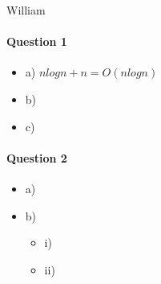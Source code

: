 William
\paragraph{Question 1}
\begin{itemize}
\item a) $nlogn+n = O(nlogn)$
\item b)
\item c) 
\end{itemize}

\paragraph{Question 2}
\begin{itemize}
\item a) 
\item b)

\begin{itemize}
\item i)
\item ii)
\end{itemize}
\end{itemize}